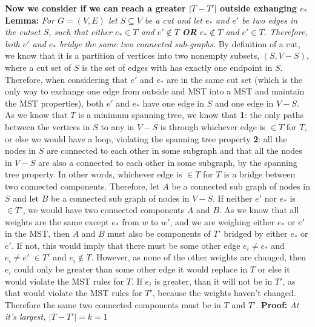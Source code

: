 \documentclass{article}
\begin{document}
\textbf{Now we consider if we can reach a greater $|T-T'|$ outside exhanging $e_*$} \newline 
\textbf{Lemma:} \textit{For $G=(V,E)$ let $S \subseteq V$ be a cut and let $e_*$ and $e'$ be two edges in the cutset $S$, such that either $e_* \in T$ and $e' \not\in T$ \textbf{OR} $e_* \not\in T$ and $e' \in T$. Therefore, both $e'$ and $e_*$ bridge the same two connected sub-graphs.}\newline
By definition of a cut, we know that it is a partition of vertices into two nonempty subsets, $(S,V-S)$, where a cut set of $S$ is the set of edges with has exactly one endpoint in $S$. Therefore, when considering that $e'$ and $e_*$ are in the same cut set (which is the only way to exchange one edge from outside and MST into a MST and maintain the MST properties), both $e'$ and $e_*$ have one edge in $S$ and one edge in $V-S$. As we know that $T$ is a minimum spanning tree, we know that \newline \textbf{1}: the only paths between the vertices in $S$ to any in $V-S$ is through whichever edge is $\in T$ for $T$, or else we would have a loop, violating the spanning tree property \newline \textbf{2}: all the nodes in $S$ are connected to each other in some subgraph and that all the nodes in $V-S$ are also a connected to each other in some subgraph, by the spanning tree property. In other words, whichever edge is $\in T$ for $T$ is a bridge between two connected components. \newline
Therefore, let $A$ be a connected sub graph of nodes in $S$ and let $B$ be a connected sub graph of nodes in $V-S$. If neither $e'$ nor $e_*$ is  $ \in T'$, we would have two connected components $A$ and $B$. As we know that all weights are the same except $e_*$ from $w$ to $w'$, and we are weighing either $e_*$ or $e'$ in the MST, then $A$ and $B$ must also be components of $T'$ bridged by either $e_*$ or $e'$. If not, this would imply that there must be some other edge $e_i\neq e_*$ and $e_i\neq e'$ $\in T'$ and $e_i \not \in T$. However, as none of the other weights are changed, then $e_i$ could only be greater than some other edge it would replace in $T$ or else it would violate the MST rules for $T$. If $e_i$ is greater, than it will not be in $T'$, as that would violate the MST rules for $T'$, because the weights haven't changed. Therefore the same two connected components must be in $T$ and $T'$. \newline  
\textbf{Proof:} \textit{At it's largest, $|T-T'|=k=1$} \newline
\end{document}
